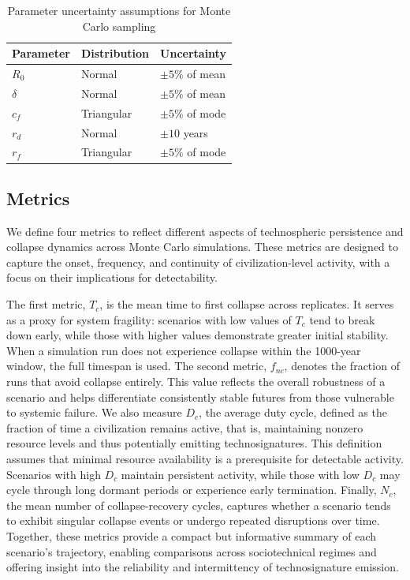 \begin{table}[htbp]
\centering
\caption{Parameter uncertainty assumptions for Monte Carlo sampling}
\label{tab:uncertainty}
\begin{tabular}{lll}
\toprule
Parameter & Distribution & Uncertainty \\
\midrule
$R_0$ & Normal & $\pm 5\%$ of mean \\
$\delta$ & Normal & $\pm 5\%$ of mean \\
$c_f$ & Triangular & $\pm 5\%$ of mode \\
$r_d$ & Normal & $\pm 10$ years \\
$r_f$ & Triangular & $\pm 5\%$ of mode \\
\bottomrule
\end{tabular}
\end{table}

\FloatBarrier

\subsection{Metrics}\label{metrics}

We define four metrics to reflect different aspects of technospheric persistence and collapse dynamics across Monte Carlo simulations. These metrics are designed to capture the onset, frequency, and continuity of civilization-level activity, with a focus on their implications for detectability.

The first metric, \(T_{c}\), is the mean time to first collapse across replicates. It serves as a proxy for system fragility: scenarios with low values of \(T_{c}\) tend to break down early, while those with higher values demonstrate greater initial stability. When a simulation run does not experience collapse within the 1000-year window, the full timespan is used. The second metric, \(f_{nc}\), denotes the fraction of runs that avoid collapse entirely. This value reflects the overall robustness of a scenario and helps differentiate consistently stable futures from those vulnerable to systemic failure. We also measure \(D_{c}\), the average duty cycle, defined as the fraction of time a civilization remains active, that is, maintaining nonzero resource levels and thus potentially emitting technosignatures. This definition assumes that minimal resource availability is a prerequisite for detectable activity. Scenarios with high \(D_{c}\) maintain persistent activity, while those with low \(D_{c}\) may cycle through long dormant periods or experience early termination. Finally, \(N_{c}\), the mean number of collapse-recovery cycles, captures whether a scenario tends to exhibit singular collapse events or undergo repeated disruptions over time. Together, these metrics provide a compact but informative summary of each scenario's trajectory, enabling comparisons across sociotechnical regimes and offering insight into the reliability and intermittency of technosignature emission.
